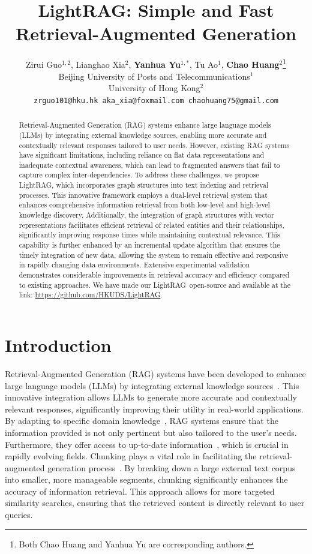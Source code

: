 \documentclass{article} %
\title{LightRAG: Simple and Fast \\ Retrieval-Augmented Generation}
\author{Zirui Guo$^{1,2}$, Lianghao Xia$^{2}$, \textbf{Yanhua Yu}$^{1,*}$, Tu Ao$^{1}$, \textbf{Chao Huang}$^{2}$\thanks{Both Chao Huang and Yanhua Yu are corresponding authors.} \\
Beijing University of Posts and Telecommunications$^1$ \\
University of Hong Kong$^2$ \\
\texttt{\small zrguo101@hku.hk\; aka\_xia@foxmail.com\; chaohuang75@gmail.com}
}
\def\model{LightRAG}
\begin{document}
\maketitle

\begin{abstract}
Retrieval-Augmented Generation (RAG) systems enhance large language models (LLMs) by integrating external knowledge sources, enabling more accurate and contextually relevant responses tailored to user needs. However, existing RAG systems have significant limitations, including reliance on flat data representations and inadequate contextual awareness, which can lead to fragmented answers that fail to capture complex inter-dependencies. To address these challenges, we propose \model, which incorporates graph structures into text indexing and retrieval processes. This innovative framework employs a dual-level retrieval system that enhances comprehensive information retrieval from both low-level and high-level knowledge discovery. Additionally, the integration of graph structures with vector representations facilitates efficient retrieval of related entities and their relationships, significantly improving response times while maintaining contextual relevance. This capability is further enhanced by an incremental update algorithm that ensures the timely integration of new data, allowing the system to remain effective and responsive in rapidly changing data environments. Extensive experimental validation demonstrates considerable improvements in retrieval accuracy and efficiency compared to existing approaches. We have made our \model\ open-source and available at the link: \textcolor{blue}{\url{https://github.com/HKUDS/LightRAG}}.
\end{abstract}


\section{Introduction}
\label{sec:intro}

Retrieval-Augmented Generation (RAG) systems have been developed to enhance large language models (LLMs) by integrating external knowledge sources~\cite{sudhi2024rag, es2024ragas, salemi2024evaluating}. This innovative integration allows LLMs to generate more accurate and contextually relevant responses, significantly improving their utility in real-world applications. By adapting to specific domain knowledge~\cite{tu2024r}, RAG systems ensure that the information provided is not only pertinent but also tailored to the user's needs. Furthermore, they offer access to up-to-date information~\cite{zhao2024retrieval}, which is crucial in rapidly evolving fields. Chunking plays a vital role in facilitating the retrieval-augmented generation process~\cite{lyu2024crud}. By breaking down a large external text corpus into smaller, more manageable segments, chunking significantly enhances the accuracy of information retrieval. This approach allows for more targeted similarity searches, ensuring that the retrieved content is directly relevant to user queries.
\end{document}
